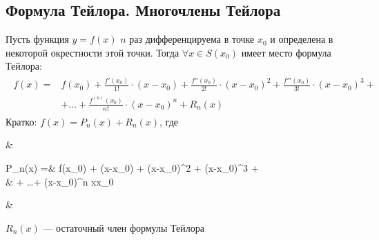 \subsection{Формула Тейлора. Многочлены Тейлора}
\begin{theorem}
	Пусть функция $y=f(x)$ $n$ раз дифференцируема в точке $x_0$ и определена в некоторой окрестности этой точки. Тогда $\forall x \in S(x_0)$ имеет место формула Тейлора:
	\begin{align}
		\begin{aligned}
			f(x) =& f(x_0)  + \frac{f'(x_0)}{1!}\cdot (x-x_0) + \frac{f''(x_0)}{2!}\cdot (x-x_0)^2 + \frac{f'''(x_0)}{3!}\cdot (x-x_0)^3 + \\
			              & + \ldots + \frac{f^{(n)}(x_0)}{n!}\cdot (x-x_0)^n + R_n(x)
		\end{aligned}
	\end{align}
	Кратко: $f(x) = P_n(x) + R_n(x)$, где
	\begin{flalign*}
		&\begin{aligned}
		P_n(x) =& f(x_0)  + \cdot (x-x_0) + \cdot (x-x_0)^2 + \cdot (x-x_0)^3 + \\
		& + \ldots + \cdot (x-x_0)^n \hspace{2cm} \qquad x\to x_0
		\end{aligned}  &
	\end{flalign*}
	$R_n(x)$ --- остаточный член формулы Тейлора
\end{theorem}
